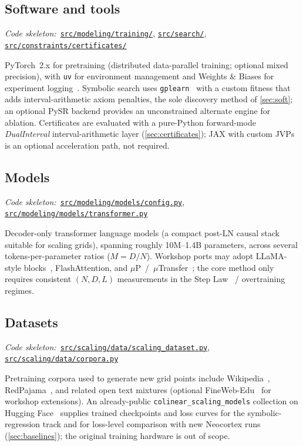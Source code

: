 \documentclass[11pt]{article}
\newcommand{\repoBlob}{https://github.com/krichelj/ByteBoost-Shape-Constrained-Boosted-SR/blob/main/}
\newcommand{\repoTree}{https://github.com/krichelj/ByteBoost-Shape-Constrained-Boosted-SR/tree/main/}
\newcommand{\pyFile}[1]{\href{\repoBlob#1}{\nolinkurl{#1}}}
\newcommand{\pyDir}[1]{\href{\repoTree#1}{\nolinkurl{#1/}}}
\newcommand{\codeRef}[1]{%
  \par\nobreak\noindent
  {\footnotesize\textit{Code skeleton:}~#1}\par\smallskip}
\theoremstyle{plain}
\theoremstyle{remark}
\begin{document}
\subsection{Software and tools}\label{sec:software}
\codeRef{\pyDir{src/modeling/training}, \pyDir{src/search}, \pyDir{src/constraints/certificates}}
PyTorch~2.x for pretraining (distributed data-parallel training; optional mixed precision), with \texttt{uv} for environment management and Weights \& Biases for experiment logging~\citep{biewald2020wandb}.
Symbolic search uses \texttt{gplearn}~\citep{stephens2015gplearn} with a custom fitness that adds interval-arithmetic axiom penalties, the sole discovery method of \cref{sec:soft}; an optional PySR backend provides an unconstrained alternate engine for ablation.
Certificates are evaluated with a pure-Python forward-mode \emph{DualInterval} interval-arithmetic layer (\cref{sec:certificates}); JAX with custom JVPs is an optional acceleration path, not required.

\subsection{Models}\label{sec:models}
\codeRef{\pyFile{src/modeling/models/config.py}, \pyFile{src/modeling/models/transformer.py}}
Decoder-only transformer language models (a compact post-LN causal stack suitable for scaling grids), spanning roughly 10M--1.4B parameters, across several tokens-per-parameter ratios ($M = D/N$).
Workshop ports may adopt LLaMA-style blocks~\citep{touvron2023llama}, FlashAttention, and $\mu$P~/~$\mu$Transfer~\citep{yang2022mup}; the core method only requires consistent $(N,D,L)$ measurements in the Step Law~\citep{li2025steplaw} / overtraining~\citep{gadre2024overtraining} regimes.

\subsection{Datasets}\label{sec:datasets}
\codeRef{\pyFile{src/scaling/data/scaling_dataset.py}, \pyFile{src/scaling/data/corpora.py}}
Pretraining corpora used to generate new grid points include Wikipedia~\citep{wikimedia2023wikipedia}, RedPajama~\citep{together2023redpajama}, and related open text mixtures (optional FineWeb-Edu~\citep{penedo2024finewebedu} for workshop extensions).
An already-public \texttt{colinear\_\allowbreak scaling\_\allowbreak models} collection on Hugging Face~\citep{kricheli2025colinear} supplies trained checkpoints and loss curves for the symbolic-regression track and for loss-level comparison with new Neocortex runs (\cref{sec:baselines}); the original training hardware is out of scope.
\end{document}
